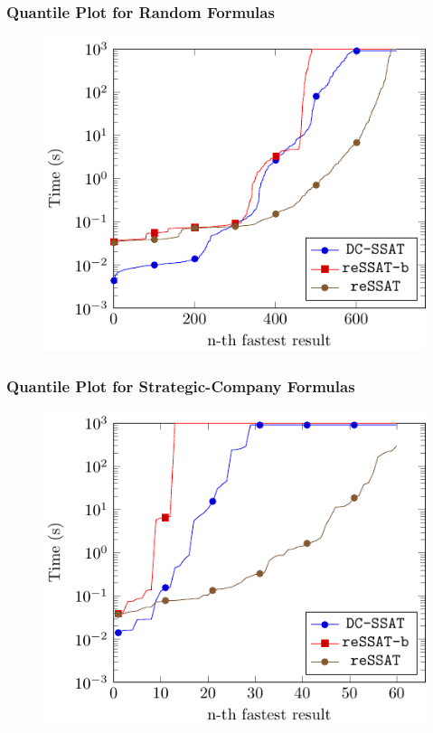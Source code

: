 \begin{frame}
    \frametitle{Quantile Plot for Random Formulas}
    \begin{figure}
        \centering
        \includegraphics{fig/random-exist-ssat/quantile-cputime-Random.pdf}
    \end{figure}
\end{frame}

\begin{frame}
    \frametitle{Quantile Plot for Strategic-Company Formulas}
    \begin{figure}
        \centering
        \includegraphics{fig/random-exist-ssat/quantile-cputime-Strategic.pdf}
    \end{figure}
\end{frame}

